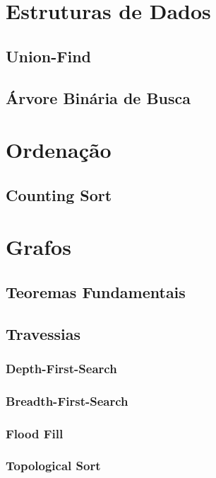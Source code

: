 \chapter{Estruturas de Dados}
    \section{Union-Find}
        
        \newpage
    \section{Árvore Binária de Busca}
        
        \newpage

\chapter{Ordenação}
    \section{Counting Sort}
        
\newpage

\chapter{Grafos}
    \section{Teoremas Fundamentais}
        
        \newpage
    \section{Travessias}
        \subsection*{Depth-First-Search}
            
        \subsection*{Breadth-First-Search}
            
        \subsection*{Flood Fill}
            
        \subsection*{Topological Sort}
            
        \newpage
